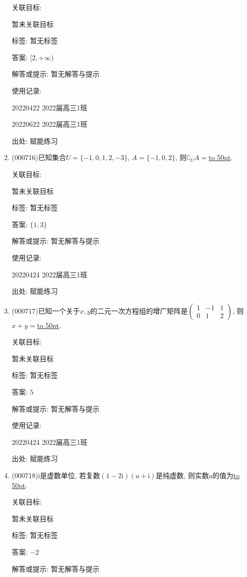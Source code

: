 \documentclass[10pt,a4paper]{article}
\newcommand{\blank}[1]{\underline{\hbox to #1pt{}}}
\begin{document}
\begin{enumerate}[1.]
关联目标:

暂未关联目标



标签: 暂无标签

答案: $[2,+\infty)$

解答或提示: 暂无解答与提示

使用记录:

20220422	2022届高三1班	

20220622	2022届高三1班  	


出处: 赋能练习
\item { (000716)}已知集合$U=\{-1,0,1,2,-3\}$, $A=\{-1,0,2\}$, 则$\complement_U A=$\blank{50}.


关联目标:

暂未关联目标



标签: 暂无标签

答案: $\{1,3\}$

解答或提示: 暂无解答与提示

使用记录:

20220424	2022届高三1班	


出处: 赋能练习
\item { (000717)}已知一个关于$x,y$的二元一次方程组的增广矩阵是$\begin{pmatrix} 1 & -1 & 1  \\ 0 & 1 & 2 \end{pmatrix}$, 则$x+y=$\blank{50}.


关联目标:

暂未关联目标



标签: 暂无标签

答案: $5$

解答或提示: 暂无解答与提示

使用记录:

20220424	2022届高三1班	


出处: 赋能练习
\item { (000718)}$\mathrm{i}$是虚数单位, 若复数$(1-2\mathrm{i})(a+\mathrm{i})$是纯虚数, 则实数$a$的值为\blank{50}.


关联目标:

暂未关联目标



标签: 暂无标签

答案: $-2$

解答或提示: 暂无解答与提示


\end{enumerate}
\end{document}
